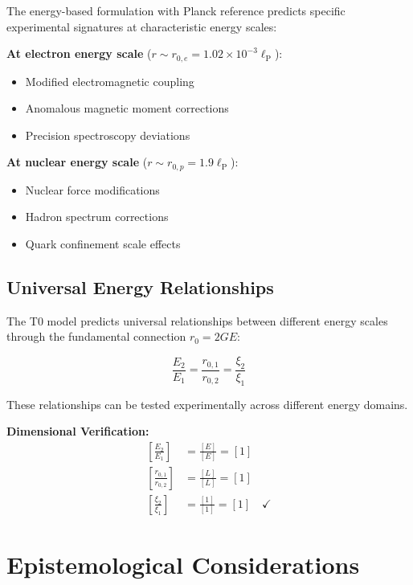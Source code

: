 \documentclass[12pt,a4paper]{report}
\newcommand{\lP}{\ell_{\text{P}}}         %
\newcommand{\rzero}{r_0}                  %
\begin{document}
	The energy-based formulation with Planck reference predicts specific experimental signatures at characteristic energy scales:
	
	\textbf{At electron energy scale} ($r \sim r_{0,e} = 1.02 \times 10^{-3} \lP$):
	\begin{itemize}
		\item Modified electromagnetic coupling
		\item Anomalous magnetic moment corrections
		\item Precision spectroscopy deviations
	\end{itemize}
	
	\textbf{At nuclear energy scale} ($r \sim r_{0,p} = 1.9 \lP$):
	\begin{itemize}
		\item Nuclear force modifications
		\item Hadron spectrum corrections
		\item Quark confinement scale effects
	\end{itemize}
	
	\subsection{Universal Energy Relationships}\label{subsec:universal_energy_relationships}
	
	The T0 model predicts universal relationships between different energy scales through the fundamental connection $\rzero = 2GE$:
	
	\begin{equation}
		\frac{E_2}{E_1} = \frac{r_{0,1}}{r_{0,2}} = \frac{\xi_{2}}{\xi_{1}}
		\label{eq:universal_energy_ratios}
	\end{equation}
	
	These relationships can be tested experimentally across different energy domains.
	
	\textbf{Dimensional Verification:}
	\begin{align}
		\left[\frac{E_2}{E_1}\right] &= \frac{[E]}{[E]} = [1] \\
		\left[\frac{r_{0,1}}{r_{0,2}}\right] &= \frac{[L]}{[L]} = [1] \\
		\left[\frac{\xi_{2}}{\xi_{1}}\right] &= \frac{[1]}{[1]} = [1] \quad \checkmark
	\end{align}
	
	\section{Epistemological Considerations}\label{sec:epistemological}
	
\end{document}
